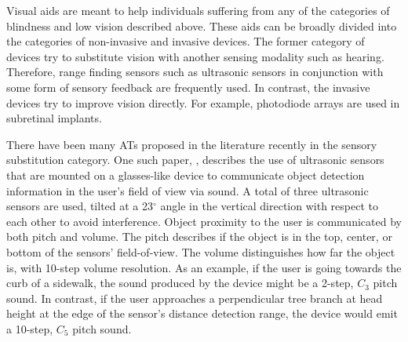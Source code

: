 Visual aids are meant to help individuals suffering from any of the categories of blindness and low vision described above. These aids can be broadly divided into the categories of non-invasive and invasive devices. The former category of devices try to substitute vision with another sensing modality such as hearing. Therefore, range finding sensors such as ultrasonic sensors in conjunction with some form of sensory feedback are frequently used. In contrast, the invasive devices try to improve vision directly. For example, photodiode arrays are used in subretinal implants. 
 
There have been many ATs proposed in the literature recently in the sensory substitution category. One such paper, \textcite{kim_3-d_2020}, describes the use of ultrasonic sensors that are mounted on a glasses-like device to communicate object detection information in the user's field of view via sound. A total of three ultrasonic sensors are used, tilted at a 23$^{\circ}$ angle in the vertical direction with respect to each other to avoid interference. Object proximity to the user is communicated by both pitch and volume. The pitch describes if the object is in the top, center, or bottom of the sensors' field-of-view. The volume distinguishes how far the object is, with 10-step volume resolution. As an example, if the user is going towards the curb of a sidewalk, the sound produced by the device might be a 2-step, $C_3$ pitch sound. In contrast, if the user approaches a perpendicular tree branch at head height at the edge of the sensor's distance detection range, the device would emit a 10-step, $C_5$ pitch sound. 

